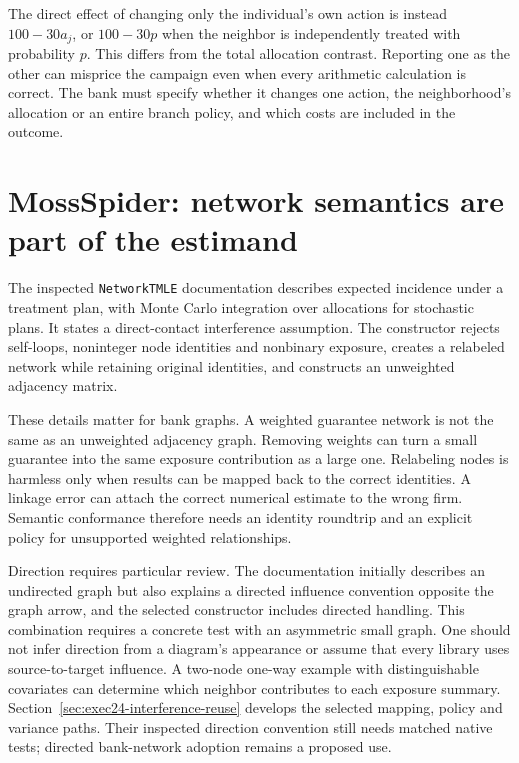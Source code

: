 The direct effect of changing only the individual's own action is instead
$100-30a_j$, or $100-30p$ when the neighbor is independently treated with
probability $p$. This differs from the total allocation contrast. Reporting
one as the other can misprice the campaign even when every arithmetic
calculation is correct. The bank must specify whether it changes one action,
the neighborhood's allocation or an entire branch policy, and which costs
are included in the outcome.

\section{MossSpider: network semantics are part of the estimand}

The inspected \texttt{NetworkTMLE} documentation describes expected incidence
under a treatment plan, with Monte Carlo integration over allocations for
stochastic plans. It states a direct-contact interference assumption. The
constructor rejects self-loops, noninteger node identities and nonbinary
exposure, creates a relabeled network while retaining original identities,
and constructs an unweighted adjacency matrix. \citep{v13_sw_mossspider}

These details matter for bank graphs. A weighted guarantee network is not the
same as an unweighted adjacency graph. Removing weights can turn a small
guarantee into the same exposure contribution as a large one. Relabeling nodes
is harmless only when results can be mapped back to the correct identities.
A linkage error can attach the correct numerical estimate to the wrong firm.
Semantic conformance therefore needs an identity roundtrip and an explicit
policy for unsupported weighted relationships.

Direction requires particular review. The documentation initially describes an
undirected graph but also explains a directed influence convention opposite
the graph arrow, and the selected constructor includes directed handling. This
combination requires a concrete test with an asymmetric small graph. One should
not infer direction from a diagram's appearance or assume that every library
uses source-to-target influence. A two-node one-way example with distinguishable
covariates can determine which neighbor contributes to each exposure summary.
Section~\ref{sec:exec24-interference-reuse} develops the selected mapping,
policy and variance paths. Their inspected direction convention still needs
matched native tests; directed bank-network adoption remains a proposed use. \citep{v13_sw_mossspider}

